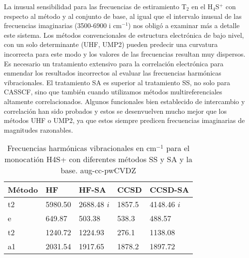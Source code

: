 \documentclass[12pt]{report}
\begin{document}
La inusual sensibilidad para las frecuencias de estiramiento T$_2$ en el H$_4$S$^+$ con respecto al método y al conjunto de base, al igual que el intervalo inusual de las frecuencias imaginarias (3500-6900 i cm$^{-1}$) nos obligó a examinar más a detalle este sistema. Los métodos convencionales de estructura electrónica de bajo nivel, con un solo determinante (UHF, UMP2) pueden predecir una curvatura incorrecta para este modo y los valores de las frecuencias resultan muy dispersos. Es necesario un tratamiento extensivo para la correlación electrónica para enmendar los resultados incorrectos al evaluar las frecuencias harmónicas vibracionales. El tratamiento SA es superior al tratamiento SS, no solo para CASSCF, sino que también cuando utilizamos métodos multireferenciales altamente correlacionados. Algunos funcionales bien establecido de intercambio y correlación han sido probados y estos se desenvuelven mucho mejor que los métodos UHF o UMP2, ya que estos siempre predicen frecuencias imaginarias de magnitudes razonables. 


\begin{table}[h]
\centering
\begin{tabular}{l|l|l|l|l}
\hline
Método & HF & HF-SA & CCSD & CCSD-SA \\ \hline
t2 & 5980.50 & 2688.48 $i$ & 1857.5 & 4148.46 $i$ \\
e & 649.87 &  503.38	& 538.3	 & 488.57 \\
t2 & 1240.72 &1224.93  & 276.1& 1138.08 \\
a1 & 2031.54 & 1917.65 & 1878.2 & 1897.72 \\ \hline
\end{tabular}
\caption{Frecuencias harmónicas vibracionales en cm$^{-1}$ para el monocatión H4S+ con diferentes métodos SS y SA y la base. aug-cc-pwCVDZ}
\label{monocationessa}
\end{table}
\end{document}
